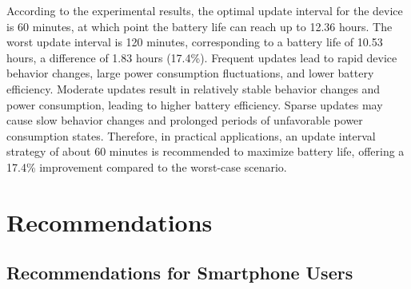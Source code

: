\documentclass{mcmthesis}  %
\begin{document}
	According to the experimental results, the optimal update interval for the device is 60 minutes, at which point the battery life can reach up to 12.36 hours. The worst update interval is 120 minutes, corresponding to a battery life of 10.53 hours, a difference of 1.83 hours (17.4\%). Frequent updates lead to rapid device behavior changes, large power consumption fluctuations, and lower battery efficiency. Moderate updates result in relatively stable behavior changes and power consumption, leading to higher battery efficiency. Sparse updates may cause slow behavior changes and prolonged periods of unfavorable power consumption states. Therefore, in practical applications, an update interval strategy of about 60 minutes is recommended to maximize battery life, offering a 17.4\% improvement compared to the worst-case scenario.
	
	
	
	
	\section{Recommendations}  %
	
	\subsection{Recommendations for Smartphone Users}
	
\end{document}
